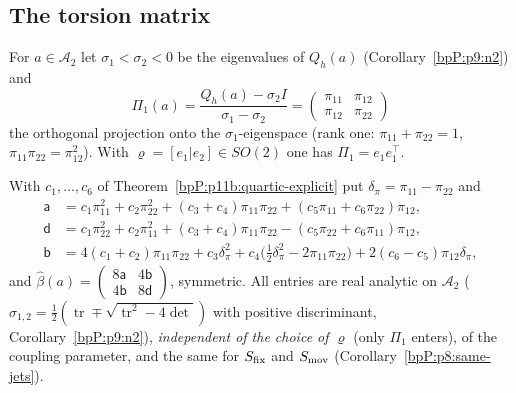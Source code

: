 \subsection{The torsion matrix}\label{bpP:p11b:sec-beta}

For $a\in\mathcal A_2$ let $\sigma_1<\sigma_2<0$ be the eigenvalues of $Q_h(a)$ (Corollary~\ref{bpP:p9:n2}) and
\[\Pi_1(a)=\frac{Q_h(a)-\sigma_2I}{\sigma_1-\sigma_2}=\begin{pmatrix}\pi_{11}&\pi_{12}\\\pi_{12}&\pi_{22}\end{pmatrix}\]
the orthogonal projection onto the $\sigma_1$-eigenspace (rank one: $\pi_{11}+\pi_{22}=1$, $\pi_{11}\pi_{22}=\pi_{12}^2$). With $\varrho=[e_1|e_2]\in SO(2)$ one has $\Pi_1=e_1e_1^\top$.

\begin{definition}\label{bpP:p11b:beta-def}
With $c_1,\dots,c_6$ of Theorem~\ref{bpP:p11b:quartic-explicit} put $\delta_\pi=\pi_{11}-\pi_{22}$ and
\begin{align*}
\mathsf a&=c_1\pi_{11}^2+c_2\pi_{22}^2+(c_3+c_4)\pi_{11}\pi_{22}+(c_5\pi_{11}+c_6\pi_{22})\pi_{12},\\
\mathsf d&=c_1\pi_{22}^2+c_2\pi_{11}^2+(c_3+c_4)\pi_{11}\pi_{22}-(c_5\pi_{22}+c_6\pi_{11})\pi_{12},\\
\mathsf b&=4(c_1+c_2)\pi_{11}\pi_{22}+c_3\delta_\pi^2+c_4\big(\tfrac12\delta_\pi^2-2\pi_{11}\pi_{22}\big)+2(c_6-c_5)\pi_{12}\delta_\pi,
\end{align*}
and $\hat\beta(a)=\begin{pmatrix}8\mathsf a&4\mathsf b\\4\mathsf b&8\mathsf d\end{pmatrix}$, symmetric. All entries are real analytic on $\mathcal A_2$ ($\sigma_{1,2}=\frac12(\operatorname{tr}\mp\sqrt{\operatorname{tr}^2-4\det})$ with positive discriminant, Corollary~\ref{bpP:p9:n2}), \emph{independent of the choice of $\varrho$} (only $\Pi_1$ enters), of the coupling parameter, and the same for $S_{\rm fix}$ and $S_{\rm mov}$ (Corollary~\ref{bpP:p8:same-jets}).
\end{definition}

